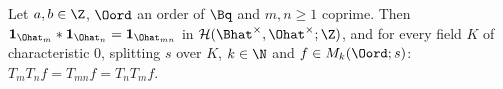 Let $a,b\in\Z$, $\Oord$ an order of $\Bq$ and $m,n\ge1$ coprime. Then $\mathbf 1_{\Ohat_m}*\mathbf 1_{\Ohat_n}=\mathbf 1_{\Ohat_{mn}}$ in
$\mathcal H(\Bhat^\times,\Ohat^\times;\Z)$, and for every field $K$ of characteristic $0$, splitting $s$ over $K$, $k\in\N$ and
$f\in M_k(\Oord;s)$: $T_mT_nf=T_{mn}f=T_nT_mf$.
